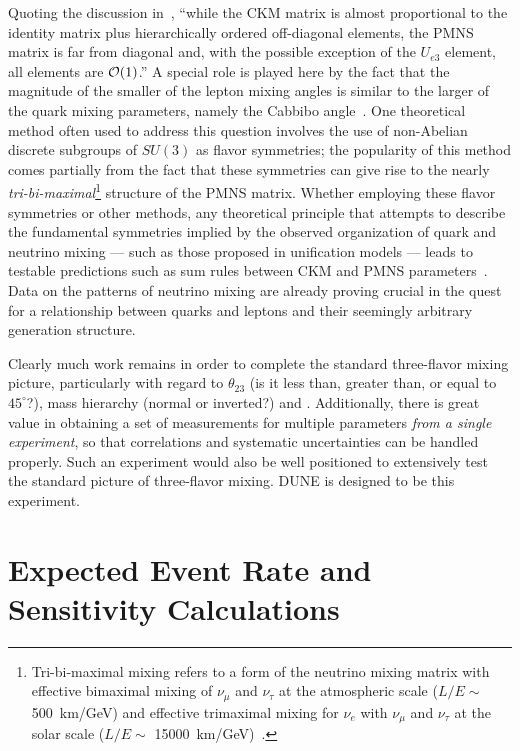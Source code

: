 Quoting the discussion in~\cite{deGouvea:2013onf}, ``while the CKM
matrix is almost proportional to the identity matrix plus
hierarchically ordered off-diagonal elements, the PMNS matrix is far
from diagonal and, with the possible exception of the $U_{e3}$
element, all elements are ${\cal O}(1)$.''
A special role is played here by the fact that the magnitude of the smaller of the lepton
mixing angles is similar to the larger of the quark mixing parameters, namely the Cabbibo angle~\cite{Boucenna:2012xb}.
One theoretical method often used to address this question involves the use of non-Abelian discrete
subgroups of $SU(3)$ as flavor symmetries; the popularity of this method comes partially from
the fact that these symmetries can give rise to the nearly \emph{tri-bi-maximal}\footnote{Tri-bi-maximal mixing refers to a form of the neutrino mixing matrix with effective bimaximal mixing of $\nu_\mu$ and $\nu_\tau$
at the atmospheric scale ($L/E \sim$ \SI{500}{\km / \GeV}) and effective trimaximal
mixing for $\nu_e$ with $\nu_\mu$ and $\nu_\tau$ 
at the solar scale ($L/E \sim$ \SI{15000}{\km / \GeV})~\cite{Harrison:2002er}.} 
structure of the PMNS matrix.
Whether employing these flavor symmetries or other methods,
any theoretical principle that attempts to describe the fundamental
symmetries implied by the observed organization of quark and neutrino
mixing --- such as those proposed in unification models --- leads to
testable predictions such as sum rules between CKM and PMNS
parameters~\cite{King:2014nza,deGouvea:2013onf,Mohapatra:2005wg,Albright:2006cw}.
Data on the patterns of neutrino mixing 
are already proving crucial in the quest for a 
relationship between quarks and leptons and their seemingly arbitrary generation
structure.  

Clearly much work remains in order to complete the standard three-flavor 
mixing picture, particularly 
with regard to $\theta_{23}$ (is it less than, greater than, or equal
to $45^\circ$?), mass hierarchy (normal or inverted?) 
and \deltacp.
Additionally, there is 
great value in obtaining a set of measurements for multiple parameters 
\emph{from a single experiment}, so that correlations and systematic 
uncertainties can be handled properly.  Such an experiment would also be 
well positioned to extensively test the standard picture of three-flavor mixing.  
DUNE is designed to be this experiment.

\section{Expected Event Rate and Sensitivity Calculations}
\label{sec:physics-lbnosc-senscalc}

